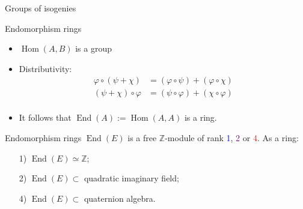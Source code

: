 \documentclass[aspectratio=169]{beamer}
\newcommand{\End}{\operatorname{End}}
\newcommand{\Hom}{\operatorname{Hom}}
\begin{document}

\begin{frame}{Groups of isogenies}
  \large
  \centering

\end{frame}


\begin{frame}{Endomorphism rings}
  \large
  \begin{itemize}
    \setlength{\itemsep}{2em}
  \item $\Hom(A,B)$ is a group
  \item Distributivity:
    \begin{align*}
      φ∘(ψ+χ) &= (φ∘ψ)+(φ∘χ)\\[2em]
      (ψ+χ)∘φ &= (ψ∘φ)+(χ∘φ)\\
    \end{align*}
  \item It follows that \emph{$\End(A) := \Hom(A,A)$} is a ring.
  \end{itemize}  
\end{frame}


\begin{frame}{Endomorphism rings}
  \large $\End(E)$ is a free $ℤ$-module of rank \textcolor{blue}{1},
  \textcolor{purple}{2} or \textcolor{red}{4}. As a ring:

  \bigskip
  \begin{enumerate}
    \setlength{\itemsep}{1em}
  \item[\color{blue}1)] $\End(E) ≃ ℤ$;
  \item[\color{purple}2)] $\End(E) ⊂$ quadratic imaginary field;
  \item[\color{red}4)] $\End(E) ⊂$ quaternion algebra.
  \end{enumerate}
\end{frame}
\end{document}
